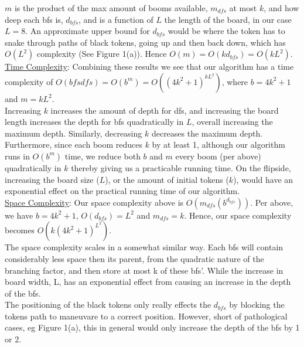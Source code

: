 \documentclass[fleqn]{article}
\begin{document}
\noindent $m$ is the product of the max amount of booms available, $m_{dfs}$ at most $k$, and how deep each bfs is, $d_{bfs}$, and is a function of $L$ the length of the board, in our case $L=8$. An approximate upper bound for $d_{bfs}$ would be where the token has to snake through paths of black tokens, going up and then back down, which has $O(L^2)$ complexity (See Figure 1(a)). Hence $O(m) = O(kd_{bfs}) = O(kL^2).$\\

\noindent \underline{Time Complexity}: Combining these results we see that our algorithm has a time complexity of $O({bfs} {dfs})= O(b^m) =  O((4k^2+1)^{kL^2})$, where $b = 4k^2 + 1$ and $m=  kL^2$.\\

\noindent Increasing $k$ increases the amount of depth for dfs, and increasing the board length increases the depth for bfs quadratically in $L$, overall increasing the maximum depth. Similarly, decreasing $k$ decreases the maximum depth. Furthermore, since each boom reduces $k$ by at least 1, although our algorithm runs in $O(b^m)$ time, we reduce both $b$ and $m$ every boom (per above) quadratically in $k$ thereby giving us a practicable running time. On the flipside, increasing the board size ($L$), or the amount of initial tokens ($k$), would have an exponential effect on the practical running time of our algorithm. \\

\noindent \underline{Space Complexity}: Our space complexity above is $O(m_{dfs}(b^{d_{bfs}}))$. Per above, we have $b = 4k^2 + 1$, $O(d_{bfs}) = L^2$ and $m_{dfs} = k$. Hence, our space complexity becomes $O(k(4k^2+1)^{L^2})$.\\

\noindent The space complexity scales in a somewhat similar way. Each bfs will contain considerably less space then its parent, from the quadratic nature of the branching factor, and then store at most k of these bfs'. While the increase in board width, L, has an exponential effect from causing an increase in the depth of the bfs. \\

\noindent The positioning of the black tokens only really effects the $d_{bfs}$ by blocking the tokens path to maneuvare to a correct position. However, short of pathological cases, eg Figure 1(a), this in general would only increase the depth of the bfs by 1 or 2.
\end{document}
